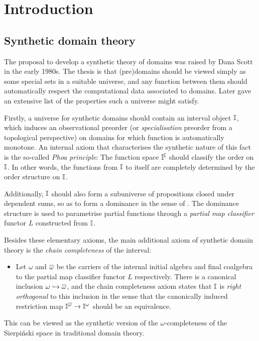 \section{Introduction}\label{sec:intro}

\subsection{Synthetic domain theory}\label{subsec:sdt}

The proposal to develop a synthetic theory of domains was raised by Dana Scott in the early 1980s. The thesis is that (pre)domains should be viewed simply as some special sets in a suitable universe, and any function between them should automatically respect the computational data associated to domains. Later \citet{hyland1990first} gave an extensive list of the properties such a universe might satisfy.

Firstly, a universe for synthetic domains should contain an interval object $\mathbb{I}$, which induces an observational preorder (or \emph{specialisation} preorder from a topological perspective) on domains for which function is automatically monotone. An internal axiom that characterises the synthetic nature of this fact is the so-called \emph{Phoa principle}: The function space $\mathbb{I}^{\mathbb{I}}$ should classify the order on $\mathbb{I}$. In other words, the functions from $\mathbb{I}$ to itself are completely determined by the order structure on $\mathbb{I}$. 

Additionally, $\mathbb{I}$ should also form a subuniverse of propositions closed under dependent sums, so as to form a dominance in the sense of \citet{rosolini1986continuity}. The dominance structure is used to parametrise partial functions through a \emph{partial map classifier} functor $L$ constructed from $\mathbb{I}$. 

Besides these elementary axioms, the main additional axiom of synthetic domain theory is the \emph{chain completeness} of the interval: 
\begin{itemize}
  \item[]
  Let $\omega$ and $\overline{\omega}$ be the carriers of the internal initial algebra and final coalgebra to the partial map classifier functor $L$ respectively. There is a canonical inclusion $\omega \hookrightarrow \overline{\omega}$, and the chain completeness axiom states that $\mathbb{I}$ is \emph{right orthogonal} to this inclusion in the sense that the canonically induced restriction map $\mathbb{I}^{\overline{\omega}} \to \mathbb{I}^{\omega}$ should be an equivalence. 
\end{itemize} 
This can be viewed as the synthetic version of the $\omega$-completeness of the Sierpi\'nski space in traditional domain theory.

